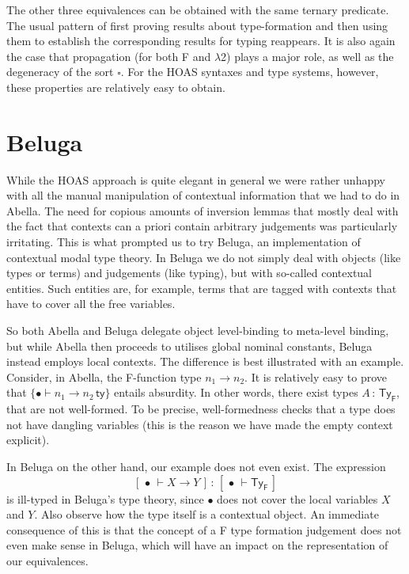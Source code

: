 \documentclass[a4paper,UKenglish]{lipics-v2016}
\newcommand{\ms}{\,}
\newcommand{\mrel}[1]{\mathrel{\ms #1 \ms}}
\newcommand{\OF}{\mrel{:}}
\newcommand{\SysL}{$\lambda$2\xspace}
\newcommand{\TyF}{\ensuremath{\mathsf{Ty_{F}}}}
\newcommand{\istyFh}[1]{\ensuremath{#1\ms\mathsf{ty}}}
\newcommand{\Typ}{\ensuremath{\square}}
\newcommand{\emptyctx}{\ensuremath{\bullet}}
\begin{document}
The other three equivalences can be obtained with the same ternary predicate.
The usual pattern of first proving results about type-formation and then using them to establish the corresponding results for typing reappears.
It is also again the case that propagation (for both F and \SysL) plays a major role, as well as the degeneracy of the sort $\Typ$.
For the HOAS syntaxes and type systems, however, these properties are relatively easy to obtain.

\section{Beluga}
\label{sec:beluga}

While the HOAS approach is quite elegant in general we were rather unhappy with all the manual manipulation of contextual information that we had to do in Abella.
The need for copious amounts of inversion lemmas that mostly deal with the fact that contexts can a priori contain arbitrary judgements was particularly irritating.
This is what prompted us to try Beluga, an implementation of contextual modal type theory.
In Beluga we do not simply deal with objects (like types or terms) and judgements (like typing), but with so-called contextual entities.
Such entities are, for example, terms that are tagged with contexts that have to cover all the free variables.

So both Abella and Beluga delegate object level-binding to meta-level binding, but while Abella then proceeds to utilises global nominal constants, Beluga instead employs local contexts.
The difference is best illustrated with an example.
Consider, in Abella, the F-function type $n_1 \to n_2$.
It is relatively easy to prove that $\{\emptyctx \vdash \istyFh{n_1 \to n_2}\}$ entails absurdity.
In other words, there exist types $A \OF \TyF$, that are not well-formed.
To be precise, well-formedness checks that a type does not have dangling variables (this is the reason we have made the empty context explicit).

\newcommand{\bc}[2]{\ensuremath{[\,#1\,\vdash #2\,]}}
In Beluga on the other hand, our example does not even exist.
The expression \[\bc{\emptyctx}{X \to Y} \OF \bc{\emptyctx}{\TyF}\] is ill-typed in Beluga's type theory, since $\emptyctx$ does not cover the local variables $X$ and $Y$.
Also observe how the type itself is a contextual object.
An immediate consequence of this is that the concept of a F type formation judgement does not even make sense in Beluga, which will have an impact on the representation of our equivalences.
\end{document}
